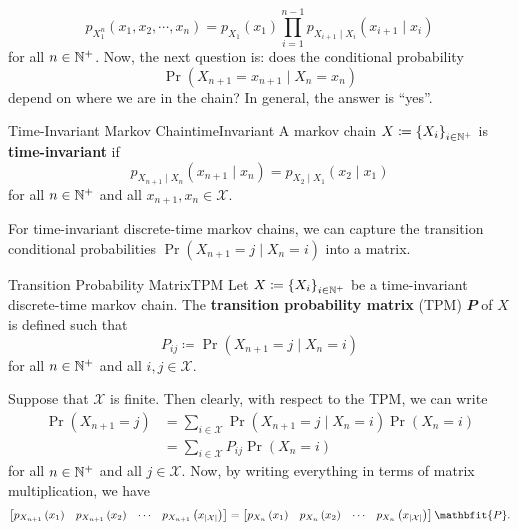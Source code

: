 \documentclass[math, code]{amznotes}
\theoremstyle{remark}
\begin{document}
\begin{equation*}
    p_{X_1^n}\left(x_1, x_2, \cdots, x_n\right) = p_{X_1}\left(x_1\right)\prod_{i = 1}^{n - 1}p_{X_{i + 1} \mid X_i}\left(x_{i + 1} \mid x_i\right)
\end{equation*}
for all $n \in \mathbb{N}^+$. Now, the next question is: does the conditional probability 
\begin{equation*}
    \Pr\left(X_{n + 1} = x_{n + 1} \mid X_n = x_n\right)
\end{equation*} 
depend on where we are in the chain? In general, the answer is ``yes''.
\begin{dfnbox}{Time-Invariant Markov Chain}{timeInvariant}
    A markov chain $X \coloneqq \left\{X_i\right\}_{i \in \mathbb{N}^+}$ is {\color{red} \textbf{time-invariant}} if 
    \begin{equation*}
        p_{X_{n + 1} \mid X_n}\left(x_{n + 1} \mid x_n\right) = p_{X_2 \mid X_1}\left(x_2 \mid x_1\right)
    \end{equation*}
    for all $n \in \mathbb{N}^+$ and all $x_{n + 1}, x_n \in \mathcal{X}$.
\end{dfnbox}
For time-invariant discrete-time markov chains, we can capture the transition conditional probabilities $\Pr\left(X_{n + 1} = j \mid X_n = i\right)$ into a matrix.
\begin{dfnbox}{Transition Probability Matrix}{TPM}
    Let $X \coloneqq \left\{X_i\right\}_{i \in \mathbb{N}^+}$ be a time-invariant discrete-time markov chain. The {\color{red} \textbf{transition probability matrix}} (TPM) $\mathbfit{P}$ of $X$ is defined such that 
    \begin{equation*}
        P_{ij} \coloneqq \Pr\left(X_{n + 1} = j \mid X_{n} = i\right)
    \end{equation*}
    for all $n \in \mathbb{N}^+$ and all $i, j \in \mathcal{X}$.
\end{dfnbox}
Suppose that $\mathcal{X}$ is finite. Then clearly, with respect to the TPM, we can write 
\begin{align*}
    \Pr\left(X_{n + 1} = j\right) & = \sum_{i \in \mathcal{X}}\Pr\left(X_{n + 1} = j \mid X_n = i\right)\Pr\left(X_n = i\right) \\
    & = \sum_{i \in \mathcal{X}}P_{ij}\Pr\left(X_n = i\right)
\end{align*}
for all $n \in \mathbb{N}^+$ and all $j \in \mathcal{X}$. Now, by writing everything in terms of matrix multiplication, we have 
\begin{equation*}
    \begin{bmatrix}
        p_{X_{n + 1}}\left(x_1\right) & p_{X_{n + 1}}\left(x_2\right) & \cdots & p_{X_{n + 1}}\left(x_{\abs{\mathcal{X}}}\right)
    \end{bmatrix} = \begin{bmatrix}
        p_{X_{n}}\left(x_1\right) & p_{X_{n}}\left(x_2\right) & \cdots & p_{X_{n}}\left(x_{\abs{\mathcal{X}}}\right)
    \end{bmatrix}\mathbfit{P}.
\end{equation*}
\end{document}
